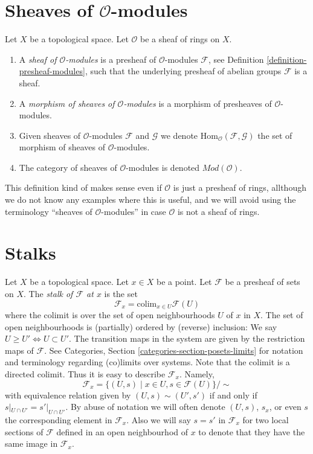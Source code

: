 \section{Sheaves of $\mathcal{O}$-modules}
\label{section-sheaves-modules}

\begin{definition}
\label{definition-sheaf-modules}
Let $X$ be a topological space.
Let $\mathcal{O}$ be a sheaf of rings on $X$.
\begin{enumerate}
\item A {\it sheaf of $\mathcal{O}$-modules} is a presheaf
of $\mathcal{O}$-modules $\mathcal{F}$,
see Definition \ref{definition-presheaf-modules},
such that the underlying presheaf of abelian groups $\mathcal{F}$
is a sheaf.
\item A {\it morphism of sheaves of $\mathcal{O}$-modules}
is a morphism of presheaves of $\mathcal{O}$-modules.
\item Given sheaves of $\mathcal{O}$-modules
$\mathcal{F}$ and $\mathcal{G}$ we denote 
$\text{Hom}_{\mathcal{O}}(\mathcal{F}, \mathcal{G})$
the set of morphism of sheaves of $\mathcal{O}$-modules.
\item The category of sheaves of $\mathcal{O}$-modules
is denoted $\textit{Mod}(\mathcal{O})$.
\end{enumerate}
\end{definition}

\noindent
This definition kind of makes sense even if $\mathcal{O}$ is just a
presheaf of rings, allthough we do not know any examples where
this is useful, and we will avoid using the terminology
``sheaves of $\mathcal{O}$-modules''
in case $\mathcal{O}$ is not a sheaf of rings.







\section{Stalks}
\label{section-stalks}

\noindent
Let $X$ be a topological space. Let $x \in X$ be a point.
Let $\mathcal{F}$ be a presheaf of sets on $X$.
The {\it stalk of $\mathcal{F}$ at $x$} is the set
$$
\mathcal{F}_x
=
\text{colim}_{x\in U} \mathcal{F}(U)
$$
where the colimit is over the set of open neighbourhoods
$U$ of $x$ in $X$. The set of open neighbourhoods is (partially)
ordered by (reverse) inclusion:
We say $U \geq U' \Leftrightarrow U \subset U'$.
The transition maps in the system are
given by the restriction maps of $\mathcal{F}$.
See Categories, Section \ref{categories-section-posets-limits}
for notation and terminology regarding (co)limits over systems.
Note that the colimit is a directed colimit.
Thus it is easy to describe $\mathcal{F}_x$. Namely,
$$
\mathcal{F}_x
=
\{
(U,s)
\mid
x\in U, s\in \mathcal{F}(U)
\}/\sim
$$
with equivalence relation given by $(U,s) \sim (U', s')$
if and only if $s|_{U\cap U'} = s'|_{U\cap U'}$. By abuse of
notation we will often denote $(U, s)$, $s_x$,
or even $s$ the corresponding element in $\mathcal{F}_x$.
Also we will say $s = s'$ in $\mathcal{F}_x$ for two local sections
of $\mathcal{F}$ defined in an open neighbourhod of $x$ to denote that
they have the same image in $\mathcal{F}_x$.

